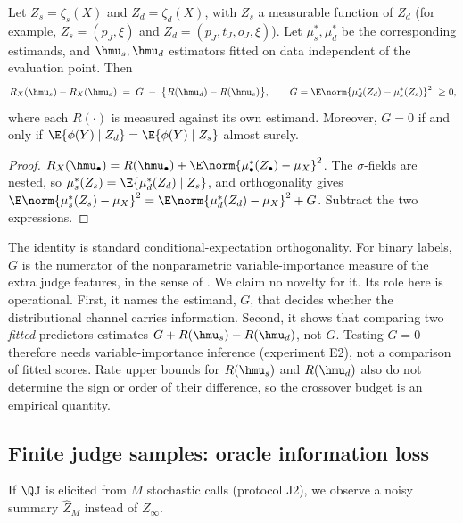 \begin{proposition}
\label{prop:scalar-vs-dist}
Let $Z_s=\zeta_s(X)$ and $Z_d=\zeta_d(X)$, with $Z_s$ a measurable function of $Z_d$ (for example,
$Z_s=(p_J,\xi)$ and $Z_d=(p_J,t_J,o_J,\xi)$). Let $\mu_s^{*},\mu_d^{*}$ be the corresponding
estimands, and $\hmu_s,\hmu_d$ estimators fitted on data independent of the evaluation point. Then
\[
  R_X(\hmu_s)-R_X(\hmu_d) \;=\; G \;-\;\bigl\{R(\hmu_d)-R(\hmu_s)\bigr\},
  \qquad G=\E\norm{\mu_d^{*}(Z_d)-\mu_s^{*}(Z_s)}^2\ \ge 0,
\]
where each $R(\cdot)$ is measured against its own estimand. Moreover, $G=0$ if and only if
$\E\{\phi(Y)\mid Z_d\}=\E\{\phi(Y)\mid Z_s\}$ almost surely.
\end{proposition}

\begin{proof}
$R_X(\hmu_\bullet)=R(\hmu_\bullet)+\E\norm{\mu_\bullet^{*}(Z_\bullet)-\mu_X}^2$. The $\sigma$-fields are
nested, so $\mu_s^{*}(Z_s)=\E\{\mu_d^{*}(Z_d)\mid Z_s\}$, and orthogonality gives
$\E\norm{\mu_s^{*}(Z_s)-\mu_X}^2=\E\norm{\mu_d^{*}(Z_d)-\mu_X}^2+G$. Subtract the two expressions.
\end{proof}

\begin{remark}
The identity is standard conditional-expectation orthogonality. For binary labels, $G$ is the
numerator of the nonparametric variable-importance measure of the extra judge features, in the
sense of \citet{williamson2021nonparametric,williamson2023general}. We claim no novelty for it. Its role here is operational. First, it names the estimand, $G$, that
decides whether the distributional channel carries information. Second, it shows that comparing
two \emph{fitted} predictors estimates $G+R(\hmu_s)-R(\hmu_d)$, not $G$. Testing $G=0$ therefore needs
variable-importance inference (experiment E2), not a comparison of fitted scores. Rate upper bounds
for $R(\hmu_s)$ and $R(\hmu_d)$ also do not determine the sign or order of their difference, so the
crossover budget is an empirical quantity.
\end{remark}

\subsection{Finite judge samples: oracle information loss}
\label{sec:judge-budget}

If $\QJ$ is elicited from $M$ stochastic calls (protocol J2), we observe a noisy summary $\hat Z_M$
instead of $Z_\infty$.

